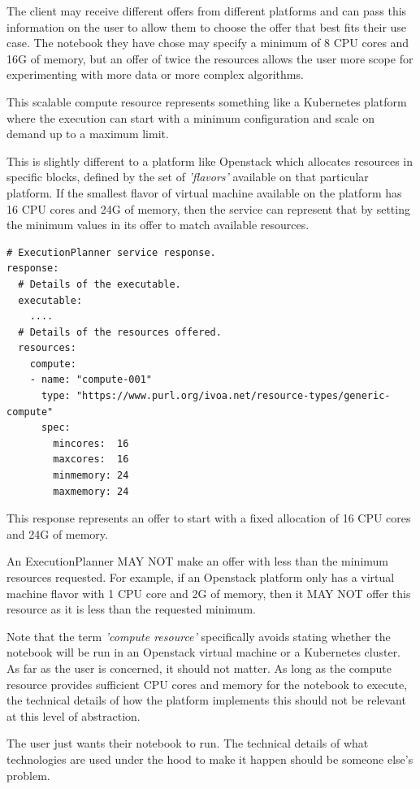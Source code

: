 \documentclass[11pt,a4paper]{ivoa}
\newcommand{\execplanner} {ExecutionPlanner}
\newcommand{\openstack} {Openstack}
\newcommand{\kubernetes} {Kubernetes}
\newcommand{\cpu} {CPU}
\newcommand{\scalable} {scalable}
\begin{document}
The client may receive different offers from different platforms and can pass this information
on the user to allow them to choose the offer that best fits their use case.
The notebook they have chose may specify a minimum of 8 \cpu{} cores and 16G of memory,
but an offer of twice the resources allows the user more scope for experimenting with
more data or more complex algorithms.

This \scalable{} compute resource represents something like a \kubernetes{} platform where the
execution can start with a minimum configuration and scale on demand up to a maximum limit.

This is slightly different to a platform like \openstack{} which allocates resources
in specific blocks, defined by the set of \textit{'flavors'} available on that particular platform.
If the smallest flavor of virtual machine available on the platform has 16 \cpu{} cores and 24G of memory,
then the service can represent that by setting the minimum values in its offer to match available resources.

\begin{lstlisting}[]
# ExecutionPlanner service response.
response:
  # Details of the executable.
  executable:
    ....
  # Details of the resources offered.
  resources:
    compute:
    - name: "compute-001"
      type: "https://www.purl.org/ivoa.net/resource-types/generic-compute"
      spec:
        mincores:  16
        maxcores:  16
        minmemory: 24
        maxmemory: 24
\end{lstlisting}

This response represents an offer to start with a fixed allocation of 16 \cpu{} cores and 24G of memory.

An \execplanner{} MAY NOT make an offer with less than the minimum resources requested.
For example, if an \openstack{} platform only has a virtual machine flavor with 1 \cpu{} core and 2G of memory,
then it MAY NOT offer this resource as it is less than the requested minimum.

Note that the term \textit{'compute resource'} specifically avoids stating whether the
notebook will be run in an \openstack{} virtual machine or a \kubernetes{} cluster.
As far as the user is concerned, it should not matter. As long as the compute resource provides
sufficient \cpu{} cores and memory for the notebook to execute, the technical details of how the
platform implements this should not be relevant at this level of abstraction.

The user just wants their notebook to run. The technical details of what technologies are used
under the hood to make it happen should be someone else's problem.
\end{document}
